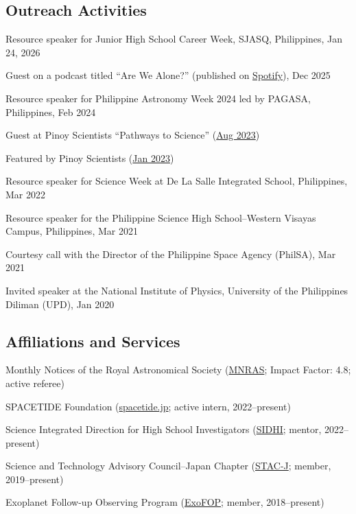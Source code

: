 \documentclass[11pt,letterpaper]{article}
\begin{document}
\subsection{Outreach Activities}
\begin{list}{}{\cvlist}
    \item Resource speaker for Junior High School Career Week, SJASQ, Philippines, Jan 24, 2026
    \item Guest on a podcast titled ``Are We Alone?'' (published on \href{https://open.spotify.com/episode/2hfoLrrP6TKyKE7mgu6pju?trackId=7BRD7x5pt8Lqa1eGYC4dzj}{Spotify}), Dec 2025
    \item Resource speaker for Philippine Astronomy Week 2024 led by PAGASA, Philippines, Feb 2024
    \item Guest at Pinoy Scientists ``Pathways to Science'' (\href{https://pinoyscientists.com/feature/2023-and-me-pinoy-scientists-year-in-review/}{Aug 2023})
    \item Featured by Pinoy Scientists (\href{https://www.facebook.com/pinoyscientists/posts/pfbid0Lj83pJZaaU35tdSpz5UKgkAodhBqMzudUjCS7z4UV32zqiqmkQzT7LdtpGTsu7Cql}{Jan 2023})
    \item Resource speaker for Science Week at De La Salle Integrated School, Philippines, Mar 2022
    \item Resource speaker for the Philippine Science High School--Western Visayas Campus, Philippines, Mar 2021
    \item Courtesy call with the Director of the Philippine Space Agency (PhilSA), Mar 2021
    \item Invited speaker at the National Institute of Physics, University of the Philippines Diliman (UPD), Jan 2020
\end{list}

\subsection{Affiliations and Services}
\begin{list}{}{\cvlist}
    \item Monthly Notices of the Royal Astronomical Society (\href{https://academic.oup.com/mnras}{MNRAS}; Impact Factor: 4.8; active referee)
    \item SPACETIDE Foundation (\href{https://spacetide.jp/en/}{spacetide.jp}; active intern, 2022--present)
    \item Science Integrated Direction for High School Investigators (\href{https://www.sidhi.org/}{SIDHI}; mentor, 2022--present)
    \item Science and Technology Advisory Council--Japan Chapter (\href{https://www.facebook.com/profile.php?id=100083271798519}{STAC-J}; member, 2019--present)
    \item Exoplanet Follow-up Observing Program (\href{https://exofop.ipac.caltech.edu/tess/}{ExoFOP}; member, 2018--present)
\end{list}
\end{document}
